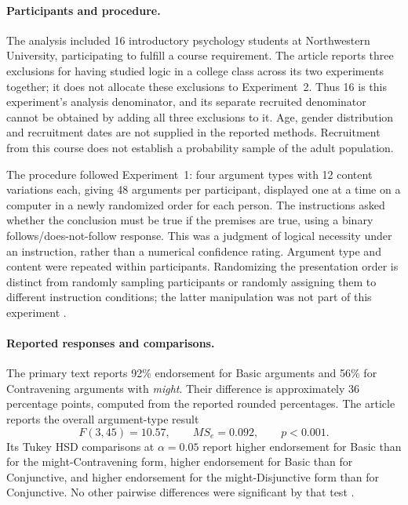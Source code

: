 \paragraph{Participants and procedure.}
The analysis included 16 introductory psychology students at Northwestern
University, participating to fulfill a course requirement. The article reports
three exclusions for having studied logic in a college class across its two
experiments together; it does not allocate these exclusions to Experiment~2.
Thus 16 is this experiment's analysis denominator, and its separate recruited
denominator cannot be obtained by adding all three exclusions to it. Age,
gender distribution and recruitment dates are not supplied in the reported
methods. Recruitment from this course does not establish a probability sample
of the adult population.

The procedure followed Experiment~1: four argument types with 12 content
variations each, giving 48 arguments per participant, displayed one at a time
on a computer in a newly randomized order for each person. The instructions
asked whether the conclusion must be true if the premises are true, using a
binary follows/does-not-follow response. This was a judgment of logical
necessity under an instruction, rather than a numerical confidence rating.
Argument type and content were repeated within participants. Randomizing the
presentation order is distinct from randomly sampling participants or randomly
assigning them to different instruction conditions; the latter manipulation
was not part of this experiment
\cite[Sec.~2.3]{CarianiRips2017Suppression}.

\paragraph{Reported responses and comparisons.}
The primary text reports 92\% endorsement for Basic arguments and 56\% for
Contravening arguments with \emph{might}. Their difference is approximately
36 percentage points, computed from the reported rounded percentages. The
article reports the overall argument-type result
\[
F(3,45)=10.57,\qquad MS_e=0.092,\qquad p<0.001.
\]
Its Tukey HSD comparisons at \(\alpha=0.05\) report higher endorsement for
Basic than for the might-Contravening form, higher endorsement for Basic than
for Conjunctive, and higher endorsement for the might-Disjunctive form than
for Conjunctive. No other pairwise differences were significant by that test
\cite[Sec.~5.4, Fig.~4]{CarianiRips2017Suppression}.

